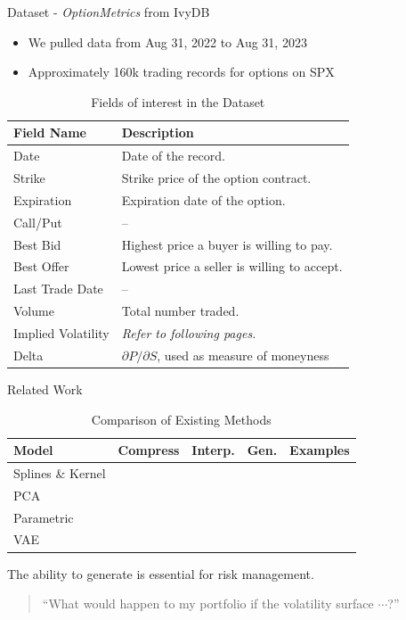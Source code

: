 \documentclass{beamer}
\newcommand{\tick}{\ding{51}}
\begin{document}
\begin{frame}{Dataset - \textit{OptionMetrics} from IvyDB}
    \begin{itemize}
        \item We pulled data from Aug 31, 2022 to Aug 31, 2023
        \item Approximately 160k trading records for options on SPX 
    \end{itemize}
    \begin{table}[h]
    \centering
    \begin{tabular}{|l|l|}
    \hline
    \textbf{Field Name} & \textbf{Description} \\
    \hline
    Date & Date of the record. \\
    Strike & Strike price of the option contract. \\
    Expiration & Expiration date of the option. \\
    Call/Put & -- \\
    Best Bid & Highest price a buyer is willing to pay. \\
    Best Offer & Lowest price a seller is willing to accept. \\
    Last Trade Date & -- \\
    Volume & Total number traded. \\
    Implied Volatility & \textit{Refer to following pages.} \\
    Delta & $\partial P / \partial S$, used as measure of moneyness \\
    \hline
    \end{tabular}
    \caption{Fields of interest in the Dataset}
    \end{table}
\end{frame}

\begin{frame}{Related Work}
    \begin{table}[h]
    \centering
    \begin{tabular}{|l|c|c|c|c|}
    \hline
    \textbf{Model} & \textbf{Compress} & \textbf{Interp.} & \textbf{Gen.} & \textbf{Examples} \\
    \hline
    Splines \& Kernel & & \tick & & \citet{orosi2012empirical}\\ \hline
    PCA & \tick & & & \citet{Sylla2000}\\ \hline 
    Parametric & \tick & \tick & & \citet{wolfram_volsurface_heston}\\ \hline
    VAE & \tick & \tick & \tick & \citet{vaeorigin}\\
    \hline
    \end{tabular}
    \caption{Comparison of Existing Methods}
    \end{table}
    The ability to generate is essential for risk management. 
    \begin{quote}
        ``What would happen to my portfolio if the volatility surface $\cdots$?''
    \end{quote}
\end{frame}
\end{document}
